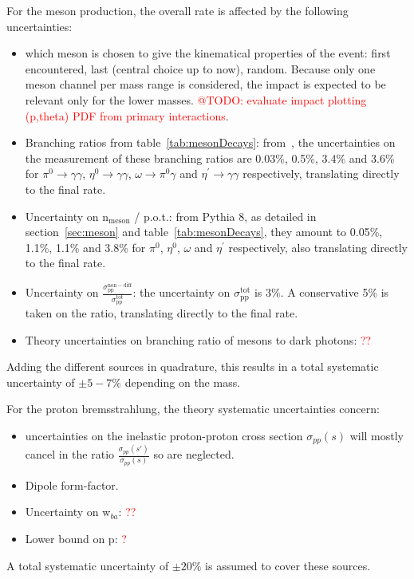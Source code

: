 \documentclass[12pt,a4paper,]{article}
\begin{document}
For the meson production, the overall rate is affected by the
following uncertainties:
\begin{itemize}
\item which meson is chosen to give the kinematical properties of the
  event: first encountered, last (central choice up to now), random. Because only
  one meson channel per mass range is considered, the impact is expected to be relevant only for the lower masses.
  \textcolor{red}{@TODO: evaluate impact plotting (p,theta) PDF from primary interactions}.
\item Branching ratios from table~\ref{tab:mesonDecays}:
  from~\cite{Patrignani:2016xqp}, the uncertainties on the measurement
  of these branching ratios are 0.03\%, 0.5\%, 3.4\% and 3.6\% for
  $\pi^0\rightarrow\gamma\gamma$, $\eta^0\rightarrow \gamma\gamma$,
  $\omega\rightarrow \pi^{0}\gamma$ and $\eta^{\prime}\rightarrow
  \gamma\gamma$ respectively, translating directly to the final rate.
\item Uncertainty on n$_{\mathrm{meson}}$ / p.o.t.: from Pythia 8, as
  detailed in section~\ref{sec:meson} and table~\ref{tab:mesonDecays},
  they amount to 0.05\%, 1.1\%, 1.1\% and 3.8\% for $\pi^0$, $\eta^0$,
  $\omega$ and $\eta^{\prime}$ respectively, also translating directly
  to the final rate.
\item Uncertainty on
  $\frac{\sigma_{\mathrm{pp}}^{\mathrm{non-diff}}}{\sigma_{\mathrm{pp}}^{\mathrm{tot}}}$:
  the uncertainty on $\sigma_{\mathrm{pp}}^{\mathrm{tot}}$ is
  3\%. A conservative 5\% is taken on the ratio, translating directly
  to the final rate.
\item Theory uncertainties on branching ratio of mesons to dark
  photons: \textcolor{red}{??}
\end{itemize}
Adding the different sources in quadrature, this results in a total
systematic uncertainty of $\pm 5-7\%$ depending on the mass.

For the proton bremsstrahlung, the theory systematic uncertainties concern:
\begin{itemize}
\item uncertainties on the inelastic proton-proton cross section
  $\sigma_{pp}(s)$ will mostly cancel in the ratio
  $\frac{\sigma_{pp}(s')}{\sigma_{pp}(s)}$ so are neglected.
\item Dipole form-factor.
\item Uncertainty on w$_{ba}$: \textcolor{red}{??}
\item Lower bound on p: \textcolor{red}{?}
\end{itemize}
A total systematic uncertainty of $\pm 20\%$ is assumed to cover these
sources.
\end{document}
